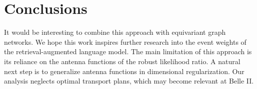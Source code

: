 \section{Conclusions}\label{sec:conclusions}

It would be interesting to combine this approach with equivariant graph
networks. We hope this work inspires further research into the event
weights of the retrieval-augmented language model. The main limitation
of this approach is its reliance on the antenna functions of the robust
likelihood ratio. A natural next step is to generalize antenna functions
in dimensional regularization. Our analysis neglects optimal transport
plans, which may become relevant at Belle II.

